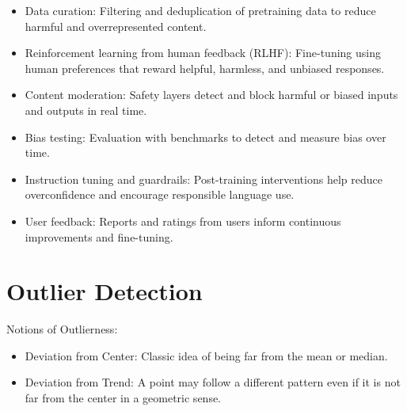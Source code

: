 \documentclass{article}
\begin{document}

\begin{itemize}
    \item Data curation: Filtering and deduplication of pretraining data to reduce harmful and overrepresented content.
    \item Reinforcement learning from human feedback (RLHF): Fine-tuning using human preferences that reward helpful, harmless, and unbiased responses.
    \item Content moderation: Safety layers detect and block harmful or biased inputs and outputs in real time.
    \item Bias testing: Evaluation with benchmarks to detect and measure bias over time.
    \item Instruction tuning and guardrails: Post-training interventions help reduce overconfidence and encourage responsible language use.
    \item User feedback: Reports and ratings from users inform continuous improvements and fine-tuning.
\end{itemize}

\newpage
\section{Outlier Detection}

Notions of Outlierness:
\begin{itemize}
    \item Deviation from Center: Classic idea of being far from the mean or median.
    \item Deviation from Trend: A point may follow a different pattern even if it is not far from the center in a geometric sense.
\end{itemize}

\end{document}
